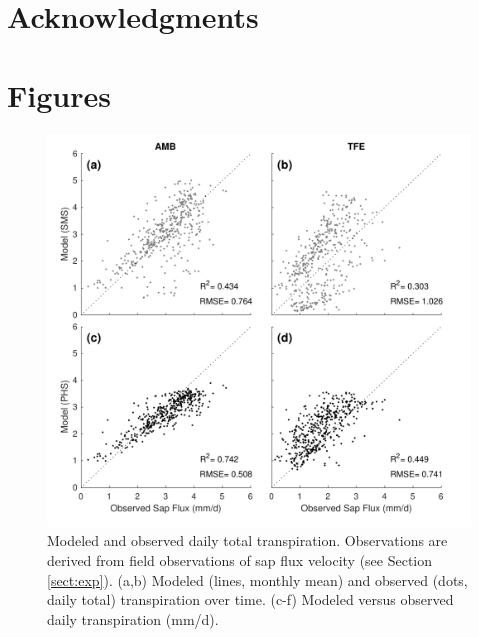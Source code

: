 \documentclass[draft,linenumbers]{agujournal}
\begin{document}
\section{Acknowledgments}

\clearpage    

\section{Figures}

  \begin{figure}[h]
     \centering
     \includegraphics[width=30pc]{../figs3/T.pdf}
     \caption{Modeled and observed daily total transpiration. Observations are derived from field observations of sap flux velocity (see Section \ref{sect:exp}).
     (a,b) Modeled (lines, monthly mean) and observed (dots, daily total) transpiration over time.
     (c-f) Modeled versus observed daily transpiration (mm/d).
     }
     \label{fig:t}
  \end{figure}
  
\end{document}
